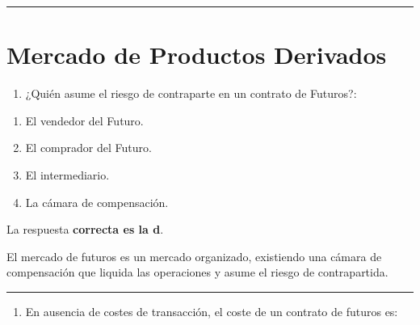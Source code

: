 \documentclass[
  letterpaper,
  DIV=11,
  numbers=noendperiod]{scrreprt}
\providecommand{\tightlist}{%
  \setlength{\itemsep}{0pt}\setlength{\parskip}{0pt}}\usepackage{longtable,booktabs,array}
\begin{document}
\begin{center}\rule{0.5\linewidth}{0.5pt}\end{center}

\hypertarget{mercado-de-productos-derivados}{%
\section*{Mercado de Productos
Derivados}\label{mercado-de-productos-derivados}}


\begin{enumerate}
\def\labelenumi{\arabic{enumi}.}
\tightlist
\item
  ¿Quién asume el riesgo de contraparte en un contrato de Futuros?:
\end{enumerate}

\begin{enumerate}
\def\labelenumi{\alph{enumi})}
\item
  El vendedor del Futuro.
\item
  El comprador del Futuro.
\item
  El intermediario.
\item
  La cámara de compensación.
\end{enumerate}

\begin{tcolorbox}[enhanced jigsaw, left=2mm, opacityback=0, colback=white, breakable, arc=.35mm, bottomrule=.15mm, rightrule=.15mm, toprule=.15mm, leftrule=.75mm, colframe=quarto-callout-tip-color-frame]
\begin{minipage}[t]{5.5mm}
\textcolor{quarto-callout-tip-color}{\faLightbulb}
\end{minipage}%
\begin{minipage}[t]{\textwidth - 5.5mm}

La respuesta \textbf{correcta es la d}.

El mercado de futuros es un mercado organizado, existiendo una cámara de
compensación que liquida las operaciones y asume el riesgo de
contrapartida.

\end{minipage}%
\end{tcolorbox}

\begin{center}\rule{0.5\linewidth}{0.5pt}\end{center}

\begin{enumerate}
\def\labelenumi{\arabic{enumi}.}
\setcounter{enumi}{1}
\tightlist
\item
  En ausencia de costes de transacción, el coste de un contrato de
  futuros es:
\end{enumerate}
\end{document}
